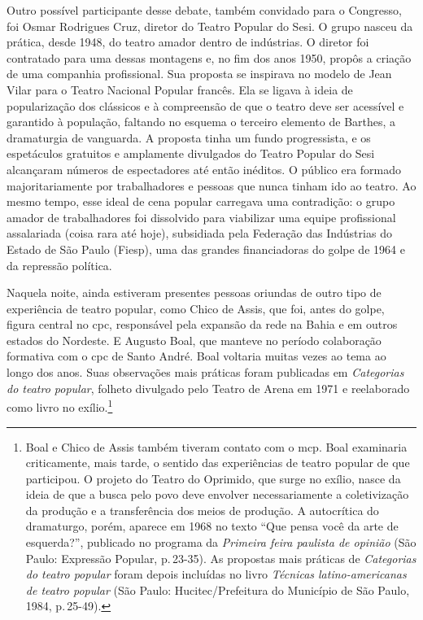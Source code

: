Outro possível participante desse debate, também convidado para o
Congresso, foi Osmar Rodrigues Cruz, diretor do Teatro Popular do Sesi.
O grupo nasceu da prática, desde 1948, do teatro amador dentro de indústrias.
O diretor foi contratado para uma dessas montagens e, no fim
dos anos 1950, propôs a criação de uma companhia profissional. Sua
proposta se inspirava no modelo de Jean Vilar para o Teatro
Nacional Popular francês. Ela se ligava à ideia de popularização dos
clássicos e à compreensão de que o teatro deve ser acessível e garantido
à população, faltando no esquema o terceiro elemento de Barthes, a
dramaturgia de vanguarda. A proposta tinha um fundo progressista, e os
espetáculos gratuitos e amplamente divulgados do Teatro Popular do Sesi
alcançaram números de espectadores até então inéditos. O público era
formado majoritariamente por trabalhadores e pessoas que nunca tinham
ido ao teatro. Ao mesmo tempo, esse ideal de cena popular carregava uma
contradição: o grupo amador de trabalhadores foi dissolvido para
viabilizar uma equipe profissional assalariada (coisa rara até hoje),
subsidiada pela Federação das Indústrias do Estado de São Paulo (Fiesp),
uma das grandes financiadoras do golpe de 1964 e da repressão política.

Naquela noite, ainda estiveram presentes pessoas oriundas de outro tipo de experiência de teatro popular, como Chico de Assis, que foi, antes do golpe,
figura central no {\sc cpc}, responsável pela expansão da rede na Bahia e em
outros estados do Nordeste. E Augusto Boal, que manteve no período
colaboração formativa com o {\sc cpc} de Santo André. Boal
voltaria muitas vezes ao tema ao longo dos anos. Suas observações mais práticas foram
publicadas em {\it Categorias do teatro popular}, folheto divulgado pelo
Teatro de Arena em 1971 e reelaborado como livro no exílio.\footnote{Boal
  e Chico de Assis também tiveram contato com o {\sc mcp}. Boal examinaria
  criticamente, mais tarde, o sentido das experiências de teatro popular
  de que participou. O projeto do Teatro do Oprimido, que surge no
  exílio, nasce da ideia de que a busca pelo povo deve envolver
  necessariamente a coletivização da produção e a transferência dos
  meios de produção. A autocrítica do dramaturgo, porém, aparece em
  1968 no texto “Que pensa você da arte de esquerda?”, publicado no
  programa da {\it Primeira feira paulista de opinião} (São Paulo:
  Expressão Popular, p.\,23-35). As propostas mais práticas de
  {\it Categorias do teatro popular} foram depois incluídas no livro
  {\it Técnicas latino-americanas de teatro popular} (São Paulo:
  Hucitec/Prefeitura do Município de São Paulo, 1984, p.\,25-49).}

